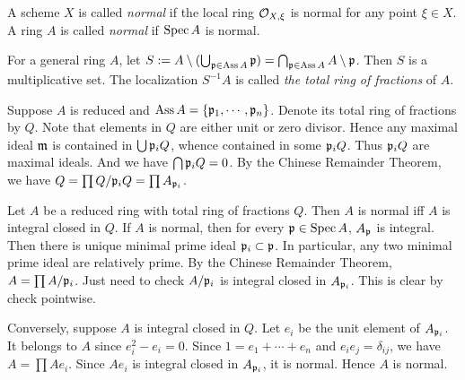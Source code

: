 
    \begin{definition}\label{def: normal of scheme and general ring}
        A scheme $X$ is called \textit{normal} if the local ring ${\mathcal{O}}_{X,\xi}$ is normal for any point $\xi \in X$.
        A ring $A$ is called \textit{normal} if $\operatorname{Spec} A$ is normal.
    \end{definition}

    \begin{remark}\label{rmk: total ring of fractions and normality of general reduced ring}
        For a general ring $A$, let $S := A\setminus (\bigcup_{{\mathfrak{p}} \in \operatorname{Ass} A} {\mathfrak{p}}) = \bigcap_{{\mathfrak{p}} \in \operatorname{Ass} A}A\setminus {\mathfrak{p}}$.
        Then $S$ is a multiplicative set.
        The localization $S^{-1}A$ is called \textit{the total ring of fractions} of $A$.
        
        Suppose $A$ is reduced and $\operatorname{Ass} A = \{{\mathfrak{p}}_1,\cdots,{\mathfrak{p}}_n\}$.
        Denote its total ring of fractions by $Q$.
        Note that elements in $Q$ are either unit or zero divisor.
        Hence any maximal ideal ${\mathfrak{m}}$ is contained in $\bigcup {\mathfrak{p}}_iQ$, whence contained in some ${\mathfrak{p}}_i Q$.
        Thus ${\mathfrak{p}}_i Q$ are maximal ideals.
        And we have $\bigcap {\mathfrak{p}}_i Q = 0$. 
        By the Chinese Remainder Theorem, we have $Q = \prod Q/{{\mathfrak{p}}_i}Q = \prod A_{{\mathfrak{p}}_i}$.
        
        Let $A$ be a reduced ring with total ring of fractions $Q$.
        Then $A$ is normal iff $A$ is integral closed in $Q$.
        If $A$ is normal, then for every ${\mathfrak{p}} \in \operatorname{Spec} A$, $A_{\mathfrak{p}}$ is integral.
        Then there is unique minimal prime ideal ${\mathfrak{p}}_i \subset {\mathfrak{p}}$.
        In particular, any two minimal prime ideal are relatively prime.
        By the Chinese Remainder Theorem, $A = \prod A/{\mathfrak{p}}_i$.
        Just need to check $A/{\mathfrak{p}}_i$ is integral closed in $A_{{\mathfrak{p}}_i}$.
        This is clear by check pointwise.

        Conversely, suppose $A$ is integral closed in $Q$.
        Let $e_i$ be the unit element of $A_{{\mathfrak{p}}_i}$.
        It belongs to $A$ since $e_i^2 - e_i = 0$.
        Since $1 = e_1 + \cdots + e_n$ and $e_ie_j = \delta_{ij}$, we have $A = \prod Ae_i$.
        Since $Ae_i$ is integral closed in $A_{{\mathfrak{p}}_i}$, it is normal.
        Hence $A$ is normal.
    \end{remark}


